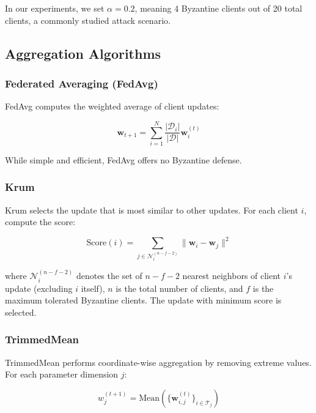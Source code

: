 \documentclass[12pt,a4paper,onecolumn]{article}
\begin{document}
In our experiments, we set $\alpha = 0.2$, meaning 4 Byzantine clients out of 20 total clients, a commonly studied attack scenario.

\subsection{Aggregation Algorithms}

\subsubsection{Federated Averaging (FedAvg)}

FedAvg computes the weighted average of client updates:

\begin{equation}
\mathbf{w}_{t+1} = \sum_{i=1}^{N} \frac{|\mathcal{D}_i|}{|\mathcal{D}|} \mathbf{w}_i^{(t)}
\label{eq:fedavg}
\end{equation}

While simple and efficient, FedAvg offers no Byzantine defense.

\subsubsection{Krum}

Krum selects the update that is most similar to other updates. For each client $i$, compute the score:

\begin{equation}
\text{Score}(i) = \sum_{j \in \mathcal{N}_i^{(n-f-2)}} \|\mathbf{w}_i - \mathbf{w}_j\|^2
\label{eq:krum_score}
\end{equation}

where $\mathcal{N}_i^{(n-f-2)}$ denotes the set of $n-f-2$ nearest neighbors of client $i$'s update (excluding $i$ itself), $n$ is the total number of clients, and $f$ is the maximum tolerated Byzantine clients. The update with minimum score is selected.

\subsubsection{TrimmedMean}

TrimmedMean performs coordinate-wise aggregation by removing extreme values. For each parameter dimension $j$:

\begin{equation}
w_j^{(t+1)} = \text{Mean}\left(\{\mathbf{w}_{i,j}^{(t)}\}_{i \in \mathcal{T}_j}\right)
\label{eq:trimmed_mean}
\end{equation}
\end{document}
